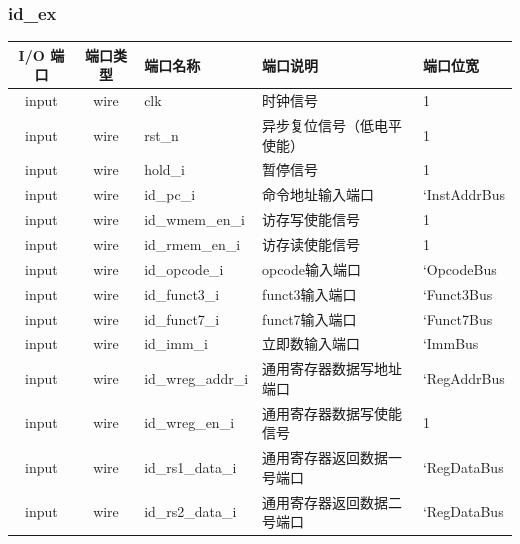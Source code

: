 \documentclass[lang=cn,11pt,a4paper,chinesefont=founder]{elegantpaper}
\begin{document}
\subsubsection{id\_ex}
\begin{tabular}{cclll}
    \toprule
    I/O 端口 & 端口类型 & 端口名称            & 端口说明                   & 端口位宽     \\
    \midrule
    input    & wire     & clk                 & 时钟信号                   & 1            \\
    input    & wire     & rst\_n              & 异步复位信号（低电平使能） & 1            \\
    input    & wire     & hold\_i             & 暂停信号                   & 1            \\

    input    & wire     & id\_pc\_i           & 命令地址输入端口           & `InstAddrBus \\
    input    & wire     & id\_wmem\_en\_i     & 访存写使能信号             & 1            \\
    input    & wire     & id\_rmem\_en\_i     & 访存读使能信号             & 1            \\
    input    & wire     & id\_opcode\_i       & opcode输入端口             & `OpcodeBus   \\
    input    & wire     & id\_funct3\_i       & funct3输入端口             & `Funct3Bus   \\
    input    & wire     & id\_funct7\_i       & funct7输入端口             & `Funct7Bus   \\
    input    & wire     & id\_imm\_i          & 立即数输入端口             & `ImmBus      \\

    input    & wire     & id\_wreg\_addr\_i   & 通用寄存器数据写地址端口   & `RegAddrBus  \\
    input    & wire     & id\_wreg\_en\_i     & 通用寄存器数据写使能信号   & 1            \\
    input    & wire     & id\_rs1\_data\_i    & 通用寄存器返回数据一号端口 & `RegDataBus  \\
    input    & wire     & id\_rs2\_data\_i    & 通用寄存器返回数据二号端口 & `RegDataBus  \\


\end{tabular}
\end{document}
